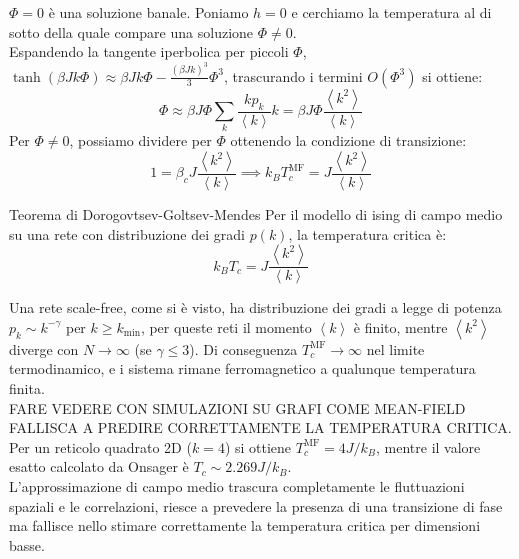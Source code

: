$\Phi =0$ è una soluzione banale. Poniamo $h=0$ e cerchiamo la temperatura al di sotto della quale compare una soluzione $\Phi \not =0$.\\
Espandendo la tangente iperbolica per piccoli $\Phi$, $\tanh(\beta Jk \Phi) \approx \beta Jk \Phi - \frac{(\beta Jk)^3}{3} \Phi^3$, trascurando i termini $O(\Phi^3)$ si ottiene:
\begin{equation}
    \Phi \approx \beta J \Phi \sum_{k}^{} \frac{k p_k}{\left\langle k\right\rangle }k = \beta J \Phi \frac{\left\langle k^2\right\rangle }{\left\langle k\right\rangle }
\end{equation}
Per $\Phi \not =0$, possiamo dividere per $\Phi$ ottenendo la condizione di transizione:
\begin{equation}
    1=\beta_c J \frac{\left\langle k^2\right\rangle }{\left\langle k\right\rangle } \implies \boxed{k_B T_c^{\text{MF}}=J \frac{\left\langle k^2\right\rangle }{\left\langle k\right\rangle }}
\end{equation}
\begin{boxl}{Teorema di Dorogovtsev-Goltsev-Mendes}
Per il modello di ising di campo medio su una rete con distribuzione dei gradi $p(k)$, la temperatura critica è:
\begin{equation}
    k_B T_c= J \frac{\left\langle k^2\right\rangle }{\left\langle k\right\rangle }
\end{equation}
\end{boxl}
Una rete scale-free, come si è visto, ha distribuzione dei gradi a legge di potenza $p_k \sim k^{-\gamma}$ per $k \ge k_{\text{min}}$, per queste reti il momento $\left\langle k\right\rangle$ è finito, mentre $\left\langle k^2\right\rangle $ diverge con $N \to \infty$ (se $\gamma \le 3$). Di conseguenza $T_c^{\text{MF}} \to \infty$ nel limite termodinamico, e i sistema rimane ferromagnetico a qualunque temperatura finita.\\

FARE VEDERE CON SIMULAZIONI SU GRAFI COME MEAN-FIELD FALLISCA A PREDIRE CORRETTAMENTE LA TEMPERATURA CRITICA.\\
Per un reticolo quadrato 2D ($k=4$) si ottiene $T_c^{\text{MF}}=4 J/k_B$, mentre il valore esatto calcolato da Onsager è $T_c \sim 2.269 J/k_B$.\\

L'approssimazione di campo medio trascura completamente le fluttuazioni spaziali e le correlazioni, riesce a prevedere la presenza di una transizione di fase ma fallisce nello stimare correttamente la temperatura critica per dimensioni basse.
